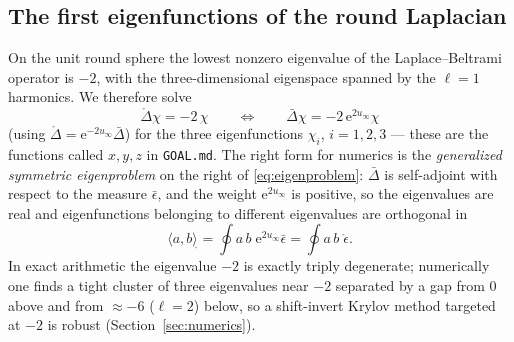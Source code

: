 \documentclass[11pt]{article}
\newcommand{\ee}{\mathrm{e}}
\newcommand{\epso}{\mathring{\epsilon}} %
\newcommand{\Lapo}{\mathring{\Delta}}   %
\begin{document}
\subsection{The first eigenfunctions of the round Laplacian}
\label{sec:eigen}

On the unit round sphere the lowest nonzero eigenvalue of the
Laplace--Beltrami operator is $-2$, with the three-dimensional eigenspace
spanned by the $\ell=1$ harmonics.  We therefore solve
\begin{equation}
  \Lapo \chi = -2\,\chi
  \qquad\Longleftrightarrow\qquad
  \bar\Delta \chi = -2\,\ee^{2u_\infty}\chi
  \label{eq:eigenproblem}
\end{equation}
(using $\Lapo = \ee^{-2u_\infty}\bar\Delta$) for the three eigenfunctions
$\chi_i$, $i=1,2,3$ --- these are the functions called $x,y,z$ in
\texttt{GOAL.md}.  The right form for numerics is the \emph{generalized
symmetric eigenproblem} on the right of \eqref{eq:eigenproblem}: $\bar\Delta$
is self-adjoint with respect to the measure $\bar\epsilon$, and the weight
$\ee^{2u_\infty}$ is positive, so the eigenvalues are real and eigenfunctions
belonging to different eigenvalues are orthogonal in
\begin{equation}
  \langle a,b\rangle_{\mathring{}}
  = \oint a\,b\;\ee^{2u_\infty}\bar\epsilon
  = \oint a\,b\;\epso .
\end{equation}
In exact arithmetic the eigenvalue $-2$ is exactly triply degenerate;
numerically one finds a tight cluster of three eigenvalues near $-2$
separated by a gap from $0$ above and from $\approx-6$ ($\ell=2$) below, so a
shift-invert Krylov method targeted at $-2$ is robust
(Section~\ref{sec:numerics}).
\end{document}
